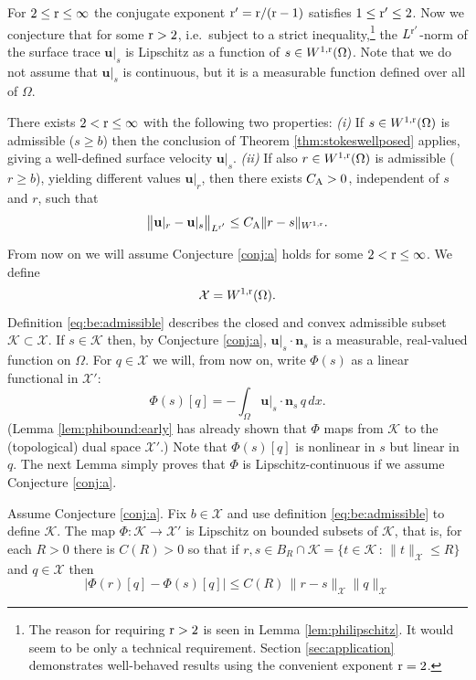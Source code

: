 \documentclass[hidelinks,onefignum,onetabnum,final]{siamart220329}  %
\newcommand{\bn}{\mathbf{n}}
\newcommand{\bu}{\mathbf{u}}
\newcommand{\cK}{\mathcal{K}}
\newcommand{\cX}{\mathcal{X}}
\newcommand{\rr}{{\text{\textnormal{r}}}}
\newcommand{\CA}{C_\text{\textnormal{A}}}
\begin{document}
For $2 \le \rr \le \infty$ the conjugate exponent $\rr'=\rr/(\rr-1)$ satisfies $1 \le \rr' \le 2$.  Now we conjecture that for some $\rr >2$, i.e.~subject to a strict inequality,\footnote{The reason for requiring $\rr>2$ is seen in Lemma \ref{lem:philipschitz}.  It would seem to be only a technical requirement.  Section \ref{sec:application} demonstrates well-behaved results using the convenient exponent $\rr=2$.} the $L^{\rr'}$-norm of the surface trace $\bu|_s$ is Lipschitz as a function of $s \in W^{1,\rr}(\Omega)$.  Note that we do not assume that $\bu|_s$ is continuous, but it is a measurable function defined over all of $\Omega$.

\begin{conjecture} \label{conj:a}  There exists $2 < \rr \le \infty$ with the following two properties:  \emph{(i)} If $s\in W^{1,\rr}(\Omega)$ is admissible ($s\ge b$) then the conclusion of Theorem \ref{thm:stokeswellposed} applies, giving a well-defined surface velocity $\bu|_s$.  \emph{(ii)} If also $r\in W^{1,\rr}(\Omega)$ is admissible ($r\ge b$), yielding different values $\bu|_r$, then there exists $\CA>0$, independent of $s$ and $r$, such that
\begin{equation}
\big\|\bu|_r - \bu|_s\big\|_{L^{\rr'}} \le \CA \|r-s\|_{W^{1,\rr}}. \label{eq:ulipschitz}
\end{equation}
\end{conjecture}

From now on we will assume Conjecture \ref{conj:a} holds for some $2 < \rr \le \infty$.  We define
\begin{equation}
\cX = W^{1,\rr}(\Omega). \label{eq:defineX}
\end{equation}
Definition \eqref{eq:be:admissible} describes the closed and convex admissible subset $\cK \subset \cX$.  If $s\in\cK$ then, by Conjecture \ref{conj:a}, $\bu|_s\cdot\bn_s$ is a measurable, real-valued function on $\Omega$.  For $q\in\cX$ we will, from now on, write $\Phi(s)$ as a linear functional in $\cX'$:
\begin{equation}
\Phi(s)[q] = -\int_\Omega \bu|_s\cdot\bn_s\,q\,dx. \label{eq:definePhi}
\end{equation}
(Lemma \ref{lem:phibound:early} has already shown that $\Phi$ maps from $\cK$ to the (topological) dual space $\cX'$.)  Note that $\Phi(s)[q]$ is nonlinear in $s$ but linear in $q$.  The next Lemma simply proves that $\Phi$ is Lipschitz-continuous if we assume Conjecture \ref{conj:a}.

\begin{lemma} \label{lem:philipschitz}
Assume Conjecture \ref{conj:a}.  Fix $b \in \cX$ and use definition \eqref{eq:be:admissible} to define $\cK$.  The map $\Phi:\cK\to\cX'$ is Lipschitz on bounded subsets of $\cK$, that is, for each $R>0$ there is $C(R)>0$ so that if $r,s\in B_R \cap \cK = \{t\in \cK\,:\,\|t\|_{\cX} \le R\}$ and $q\in\cX$ then
\begin{equation}
\Big|\Phi(r)[q] - \Phi(s)[q]\Big| \le C(R)\, \|r-s\|_{\cX} \|q\|_{\cX}  \label{eq:philipschitz}
\end{equation}
\end{lemma}
\end{document}
